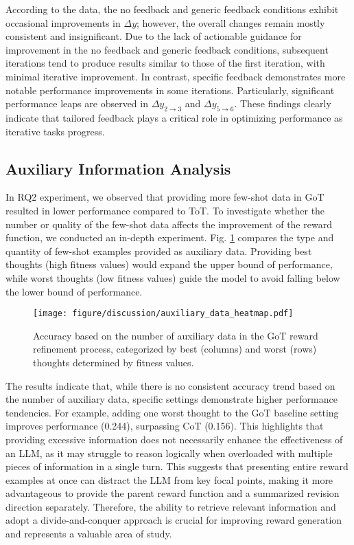 According to the data, the no feedback and generic feedback conditions exhibit occasional improvements in $\Delta y$; however, the overall changes remain mostly consistent and insignificant. Due to the lack of actionable guidance for improvement in the no feedback and generic feedback conditions, subsequent iterations tend to produce results similar to those of the first iteration, with minimal iterative improvement.
In contrast, specific feedback demonstrates more notable performance improvements in some iterations. Particularly, significant performance leaps are observed in $\Delta y_{2 \to 3}$ and $\Delta y_{5 \to 6}$. These findings clearly indicate that tailored feedback plays a critical role in optimizing performance as iterative tasks progress.


\subsection{Auxiliary Information Analysis}
\label{sec:aux_info_analysis}

In RQ2 experiment, we observed that providing more few-shot data in GoT resulted in lower performance compared to ToT.
To investigate whether the number or quality of the few-shot data affects the improvement of the reward function, we conducted an in-depth experiment.
Fig. \ref{fig:auxiliary_data_heatmap} compares the type and quantity of few-shot examples provided as auxiliary data.
Providing best thoughts (high fitness values) would expand the upper bound of performance, while worst thoughts (low fitness values) guide the model to avoid falling below the lower bound of performance.


\begin{figure}[!h]
    \centering
    \texttt{[image: figure/discussion/auxiliary\_data\_heatmap.pdf]}
    \caption{Accuracy based on the number of auxiliary data in the GoT reward refinement process, categorized by best (columns) and worst (rows) thoughts determined by fitness values.}
    \label{fig:auxiliary_data_heatmap}
\end{figure}


The results indicate that, while there is no consistent accuracy trend based on the number of auxiliary data, specific settings demonstrate higher performance tendencies.
For example, adding one worst thought to the GoT baseline setting improves performance (0.244), surpassing CoT (0.156).
This highlights that providing excessive information does not necessarily enhance the effectiveness of an LLM, as it may struggle to reason logically when overloaded with multiple pieces of information in a single turn.
This suggests that presenting entire reward examples at once can distract the LLM from key focal points, making it more advantageous to provide the parent reward function and a summarized revision direction separately.
Therefore, the ability to retrieve relevant information and adopt a divide-and-conquer approach is crucial for improving reward generation and represents a valuable area of study.
